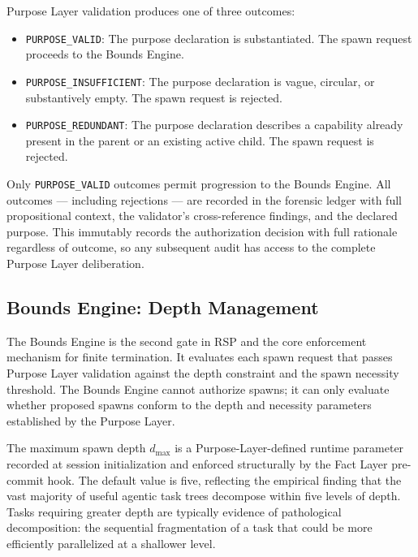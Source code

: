 Purpose Layer validation produces one of three outcomes:

\begin{itemize}
    \itemsep0em
    \item \texttt{PURPOSE\_VALID}: The purpose declaration is substantiated. The spawn request proceeds to the Bounds Engine.
    \item \texttt{PURPOSE\_INSUFFICIENT}: The purpose declaration is vague, circular, or substantively empty. The spawn request is rejected.
    \item \texttt{PURPOSE\_REDUNDANT}: The purpose declaration describes a capability already present in the parent or an existing active child. The spawn request is rejected.
\end{itemize}

Only \texttt{PURPOSE\_VALID} outcomes permit progression to the Bounds Engine. All outcomes — including rejections — are recorded in the forensic ledger with full propositional context, the validator's cross-reference findings, and the declared purpose. This immutably records the authorization decision with full rationale regardless of outcome, so any subsequent audit has access to the complete Purpose Layer deliberation.

\subsection{Bounds Engine: Depth Management}

The Bounds Engine is the second gate in RSP and the core enforcement mechanism for finite termination. It evaluates each spawn request that passes Purpose Layer validation against the depth constraint and the spawn necessity threshold. The Bounds Engine cannot authorize spawns; it can only evaluate whether proposed spawns conform to the depth and necessity parameters established by the Purpose Layer.


The maximum spawn depth $d_{\max}$ is a Purpose-Layer-defined runtime parameter recorded at session initialization and enforced structurally by the Fact Layer pre-commit hook. The default value is five, reflecting the empirical finding that the vast majority of useful agentic task trees decompose within five levels of depth. Tasks requiring greater depth are typically evidence of pathological decomposition: the sequential fragmentation of a task that could be more efficiently parallelized at a shallower level.

